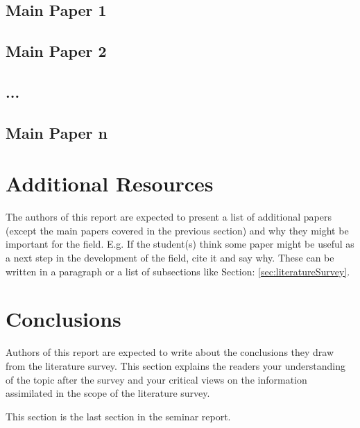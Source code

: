 \documentclass[]{tukseminar}
\begin{document}
\subsection{Main Paper 1}
\subsection{Main Paper 2}
\subsection{...}
\subsection{Main Paper n}

\section{Additional Resources}
\label{sec:additionalResources}
The authors of this report are expected to present a list of additional papers (except the main papers covered in the previous section) and why they might be important for the field. E.g. If the student(s) think some paper might be useful as a next step in the development of the field, cite it and say why. These can be written in a paragraph or a list of subsections like Section: \ref{sec:literatureSurvey}. 

\section{Conclusions}
\label{sec:conclusions}
Authors of this report are expected to write about the conclusions they draw from the literature survey. This section explains the readers your understanding of the topic after the survey and your critical views on the information assimilated in the scope of the literature survey. 

This section is the last section in the seminar report.

















\nocite{*}




\end{document}
